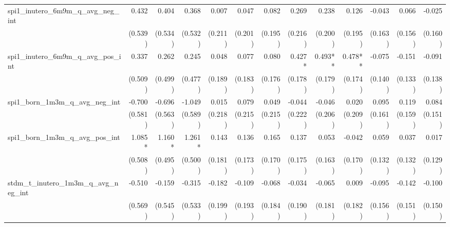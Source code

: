 \begin{tabular}{lrrrrrrrrrrrr}
spi1\_inutero\_6m9m\_q\_avg\_neg\_int       &        0.432 &        0.404 &        0.368 &        0.007 &        0.047 &        0.082 &        0.269 &        0.238 &        0.126 &       -0.043 &        0.066 &       -0.025 \\ 
                                            &      (0.539) &      (0.534) &      (0.532) &      (0.211) &      (0.201) &      (0.195) &      (0.216) &      (0.200) &      (0.195) &      (0.163) &      (0.156) &      (0.160) \\ 
spi1\_inutero\_6m9m\_q\_avg\_pos\_int       &        0.337 &        0.262 &        0.245 &        0.048 &        0.077 &        0.080 &       0.427* &      0.493** &      0.478** &       -0.075 &       -0.151 &       -0.091 \\ 
                                            &      (0.509) &      (0.499) &      (0.477) &      (0.189) &      (0.183) &      (0.176) &      (0.178) &      (0.179) &      (0.174) &      (0.140) &      (0.133) &      (0.138) \\ 
spi1\_born\_1m3m\_q\_avg\_neg\_int          &       -0.700 &       -0.696 &       -1.049 &        0.015 &        0.079 &        0.049 &       -0.044 &       -0.046 &        0.020 &        0.095 &        0.119 &        0.084 \\ 
                                            &      (0.581) &      (0.563) &      (0.589) &      (0.218) &      (0.215) &      (0.215) &      (0.222) &      (0.206) &      (0.209) &      (0.161) &      (0.159) &      (0.151) \\ 
spi1\_born\_1m3m\_q\_avg\_pos\_int          &       1.085* &       1.160* &       1.261* &        0.143 &        0.136 &        0.165 &        0.137 &        0.053 &       -0.042 &        0.059 &        0.037 &        0.017 \\ 
                                            &      (0.508) &      (0.495) &      (0.500) &      (0.181) &      (0.173) &      (0.170) &      (0.175) &      (0.163) &      (0.170) &      (0.132) &      (0.132) &      (0.129) \\ 
stdm\_t\_inutero\_1m3m\_q\_avg\_neg\_int    &       -0.510 &       -0.159 &       -0.315 &       -0.182 &       -0.109 &       -0.068 &       -0.034 &       -0.065 &        0.009 &       -0.095 &       -0.142 &       -0.100 \\ 
                                            &      (0.569) &      (0.545) &      (0.533) &      (0.199) &      (0.193) &      (0.184) &      (0.190) &      (0.181) &      (0.182) &      (0.156) &      (0.151) &      (0.150) \\ 

\end{tabular}
